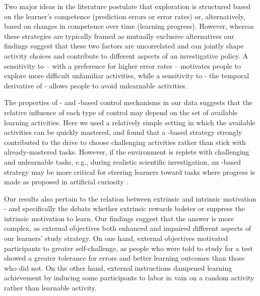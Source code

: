     Two major ideas in the literature postulate that exploration is structured based on the learner’s competence (prediction errors or error rates) or, alternatively, based on changes in competence over time (learning progress). However, whereas these strategies are typically framed as mutually exclusive alternatives \cite{kaplan2003motivational,kaplan2007search,mirolli2013functions,santucci2013best} our findings suggest that these two factors are uncorrelated and can jointly shape activity choices and contribute to different aspects of an investigative policy. A sensitivity to {\PC} -- with a preference for higher error rates -- motivates people to explore more difficult unfamiliar activities, while a sensitivity to {\LP} - the temporal derivative of {\PC}  - allows people to avoid unlearnable activities. 
   
    The properties of {\PC}- and {\LP}-based control mechanisms in our data suggests that the relative influence of each type of control may depend on the set of available learning activities. Here we used a relatively simple setting in which the available activities can be quickly mastered, and found that a {\PC}-based strategy strongly contributed to the drive to choose challenging activities rather than stick with already-mastered tasks. However, if the environment is replete with challenging and unlearnable tasks, e.g., during realistic scientific investigation, an {\LP}-based strategy may be more critical for steering learners toward tasks where progress is made as proposed in artificial curiosity \cite{kaplan2007search,schmidhuber2010formal,colas2019curious}.
   
    Our results also pertain to the relation between extrinsic and intrinsic motivation - and specifically the debate whether extrinsic rewards bolster \cite{duan2020effect} or suppress \cite{murayama2019motivated} the intrinsic motivation to learn. Our findings suggest that the answer is more complex, as external objectives both enhanced and impaired different aspects of our learners' study strategy. On one hand, external objectives motivated participants to greater self-challenge, as people who were told to study for a test showed a greater tolerance for errors and better learning outcomes than those who did not. On the other hand, external instructions dampened learning achievement by inducing some participants to labor in vain on a random activity rather than learnable activity.
   
